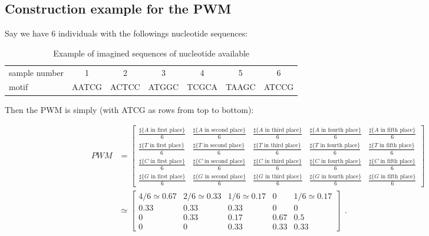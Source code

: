 \documentclass[../main.tex]{subfiles}
\begin{document}
\subsection{Construction example for the PWM}\label{sub:pwm}
Say we have $6$ individuals with the followings nucleotide sequences:

\begin{table}[ht]
\caption{Example of imagined sequences of nucleotide available}
\centering
\begin{tabular}{|l|cccccc|}
    \hline
    sample number & 1     & 2      & 3      & 4      & 5     & 6 \\
    motif         & AATCG & ACTCC  & ATGGC  & TCGCA  & TAAGC & ATCCG\\
    \hline
\end{tabular}
\end{table}

Then the PWM is simply (with ATCG as rows from top to bottom):

\begin{align*}
    PWM &= \begin{bmatrix}
        \frac{\sharp \{A\text{ in first place}\}}{6} & \frac{\sharp \{A\text{ in second place}\}}{6} & \frac{\sharp \{A\text{ in third place}\}}{6} & \frac{\sharp \{A\text{ in fourth place}\}}{6} & \frac{\sharp \{A\text{ in fifth place}\}}{6} \\
        \frac{\sharp \{T\text{ in first place}\}}{6} & \frac{\sharp \{T\text{ in second place}\}}{6} & \frac{\sharp \{T\text{ in third place}\}}{6} & \frac{\sharp \{T\text{ in fourth place}\}}{6} & \frac{\sharp \{T\text{ in fifth place}\}}{6} \\
        \frac{\sharp \{C\text{ in first place}\}}{6} & \frac{\sharp \{C\text{ in second place}\}}{6} & \frac{\sharp \{C\text{ in third place}\}}{6} & \frac{\sharp \{C\text{ in fourth place}\}}{6} & \frac{\sharp \{C\text{ in fifth place}\}}{6} \\
        \frac{\sharp \{G\text{ in first place}\}}{6} & \frac{\sharp \{G\text{ in second place}\}}{6} & \frac{\sharp \{G\text{ in third place}\}}{6} & \frac{\sharp \{G\text{ in fourth place}\}}{6} & \frac{\sharp \{G\text{ in fifth place}\}}{6}
    \end{bmatrix} \\
  & \simeq \begin{bmatrix}
    4/6\simeq 0.67 & 2/6\simeq 0.33 & 1/6\simeq 0.17 & 0 & 1/6\simeq 0.17\\
    0.33 & 0.33 & 0.33 & 0 & 0 \\
    0 & 0.33 & 0.17 & 0.67 & 0.5 \\
    0 & 0 & 0.33 & 0.33 & 0.33
\end{bmatrix}\enspace.
\end{align*}
\end{document}
